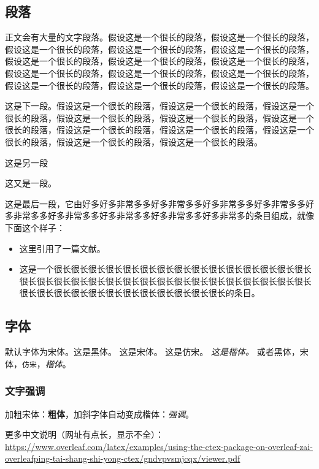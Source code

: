 \documentclass[12pt]{article} %
\begin{document}
\subsection{段落}
正文会有大量的文字段落。假设这是一个很长的段落，假设这是一个很长的段落，假设这是一个很长的段落，假设这是一个很长的段落，假设这是一个很长的段落，假设这是一个很长的段落，假设这是一个很长的段落，假设这是一个很长的段落，假设这是一个很长的段落，假设这是一个很长的段落，假设这是一个很长的段落，假设这是一个很长的段落，假设这是一个很长的段落，假设这是一个很长的段落。

这是下一段。假设这是一个很长的段落，假设这是一个很长的段落，假设这是一个很长的段落，假设这是一个很长的段落，假设这是一个很长的段落，假设这是一个很长的段落，假设这是一个很长的段落，假设这是一个很长的段落，假设这是一个很长的段落，假设这是一个很长的段落，假设这是一个很长的段落。

这是另一段

这又是一段。

这是最后一段，它由好多好多非常多多好多非常多多好多非常多多好多非常多多好多非常多多好多非常多多好多非常多多好多非常多多好多非常多的条目组成，就像下面这个样子：

\begin{itemize}
  \item 这里引用了一篇文献\cite{aokiPointNetLKRobustEfficient2019}。
  \item 这是一个很长很长很长很长很长很长很长很长很长很长很长很长很长很长很长很长很长很长很长很长很长很长很长很长很长很长很长很长很长很长很长很长很长很长很长很长很长很长很长很长很长很长很长很长的条目。
\end{itemize}

\subsection{字体}
默认字体为宋体。{\sffamily 这是黑体。} {\rmfamily 这是宋体。} {\ttfamily 这是仿宋。} {\it 这是楷体。}
或者\textsf{黑体}，\textrm{宋体}，\texttt{仿宋}，\textit{楷体}。

\subsubsection{文字强调}
加粗宋体：\textbf{粗体}，加斜字体自动变成楷体：\textit{强调}。

更多中文说明（网址有点长，显示不全）：\\\url{https://www.overleaf.com/latex/examples/using-the-ctex-package-on-overleaf-zai-overleafping-tai-shang-shi-yong-ctex/gndvpvsmjcqx/viewer.pdf}
\end{document}
